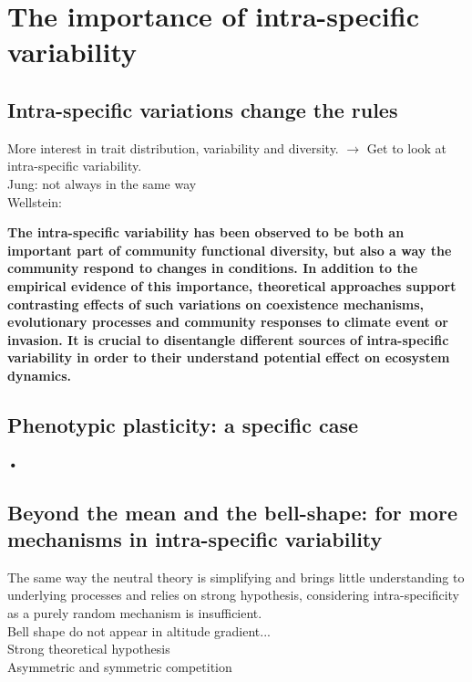 \chapter{The importance of intra-specific variability}

\section{Intra-specific variations change the rules}

More interest in trait distribution, variability and diversity. $\rightarrow$ Get to look at intra-specific variability.\\
Jung: not always in the same way\\
Wellstein: 

\textbf{The intra-specific variability has been observed to be both an important part of community functional diversity, but also a way the community respond to changes in conditions. In addition to the empirical evidence of this importance, theoretical approaches support contrasting effects of such variations on coexistence mechanisms, evolutionary processes and community responses to climate event or invasion. It is crucial to disentangle different sources of intra-specific variability in order to their understand potential effect on ecosystem dynamics.}

\section{Phenotypic plasticity: a specific case}

\textbf{•}


\section{Beyond the mean and the bell-shape: for more mechanisms in intra-specific variability}
The same way the neutral theory is simplifying and brings little understanding to underlying processes and relies on strong hypothesis, considering intra-specificity as a purely random mechanism is insufficient.\\
Bell shape do not appear in altitude gradient...\\
Strong theoretical hypothesis\\
Asymmetric and symmetric competition\\

